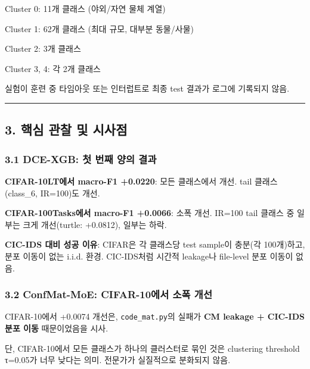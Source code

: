 \par\noindent \textbullet\enspace Cluster 0: 11개 클래스 (야외/\allowbreak{}자연 물체 계열)


\par\noindent \textbullet\enspace Cluster 1: 62개 클래스 (최대 규모, 대부분 동물/\allowbreak{}사물)


\par\noindent \textbullet\enspace Cluster 2: 3개 클래스


\par\noindent \textbullet\enspace Cluster 3, 4: 각 2개 클래스


실험이 훈련 중 타임아웃 또는 인터럽트로 최종 test 결과가 로그에 기록되지 않음.




\medskip\hrule\medskip
\subsection{3. 핵심 관찰 및 시사점}
\subsubsection{3.1 DCE-XGB: 첫 번째 양의 결과}
\par\noindent \textbullet\enspace \textbf{CIFAR-10LT에서 macro-F1 +\allowbreak{}0.0220}: 모든 클래스에서 개선. tail 클래스(class\_\allowbreak{}6, IR=\allowbreak{}100)도 개선.


\par\noindent \textbullet\enspace \textbf{CIFAR-100Tasks에서 macro-F1 +\allowbreak{}0.0066}: 소폭 개선. IR=\allowbreak{}100 tail 클래스 중 일부는 크게 개선(turtle: +\allowbreak{}0.0812), 일부는 하락.


\par\noindent \textbullet\enspace \textbf{CIC-IDS 대비 성공 이유}: CIFAR은 각 클래스당 test sample이 충분(각 100개)하고, 분포 이동이 없는 i.i.d. 환경. CIC-IDS처럼 시간적 leakage나 file-level 분포 이동이 없음.


\subsubsection{3.2 ConfMat-MoE: CIFAR-10에서 소폭 개선}
\par\noindent \textbullet\enspace CIFAR-10에서 +\allowbreak{}0.0074 개선은, \texttt{code\_\allowbreak{}\allowbreak{}mat\allowbreak{}.\allowbreak{}py}의 실패가 \textbf{CM leakage +\allowbreak{} CIC-IDS 분포 이동} 때문이었음을 시사.


\par\noindent \textbullet\enspace 단, CIFAR-10에서 모든 클래스가 하나의 클러스터로 묶인 것은 clustering threshold τ=\allowbreak{}0.05가 너무 낮다는 의미. 전문가가 실질적으로 분화되지 않음.


